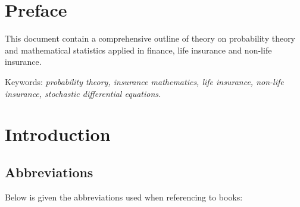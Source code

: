 \documentclass[a4paper,12pt,openany]{book}
\begin{document}
\chapter*{Preface}

This document contain a comprehensive outline of theory on probability theory and mathematical statistics applied in finance, life insurance and non-life insurance.

\vspace{5pt}
\noindent Keywords: \emph{probability theory, insurance mathematics, life insurance,
non-life insurance, stochastic differential equations.}

\newpage

\begin{spacing}{1}
\tableofcontents
\end{spacing}

\newpage

\setcounter{page}{1}
\pagestyle{fancy}
\fancyhf{}
\renewcommand{\headrulewidth}{0pt}
\fancyhead[LE]{\fontsize{11}{12} \selectfont\nouppercase{\thepage}}
\fancyhead[RE]{\fontsize{11}{12} \selectfont\nouppercase{\leftmark}}
\fancyhead[LO]{\fontsize{11}{12} \selectfont\nouppercase{\rightmark}}
\fancyhead[RO]{\fontsize{11}{12} \selectfont\nouppercase{\thepage}}
\allowdisplaybreaks
\setlength{\abovedisplayskip}{10pt}
\setlength{\belowdisplayskip}{10pt}
\setlength{\abovedisplayshortskip}{-12pt}%
\setlength{\belowdisplayshortskip}{0pt}
\hypertarget{introduction}{%
\chapter{Introduction}\label{introduction}}

\hypertarget{abbreviations}{%
\section{Abbreviations}\label{abbreviations}}

Below is given the abbreviations used when referencing to books:
\end{document}
